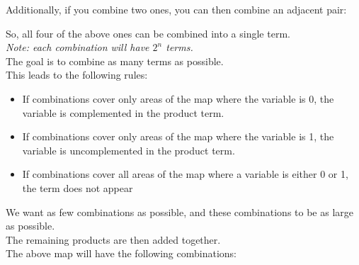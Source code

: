 \documentclass[nobib]{tufte-handout}
\begin{document}
Additionally, if you combine two ones, you can then combine an adjacent pair:
\begin{center}
\end{center}
So, all four of the above ones can be combined into a single term.\\
\textit{Note: each combination will have $2^n$ terms.}\\
The goal is to combine as many terms as possible.\\
This leads to the following rules:
\begin{itemize}
    \item If combinations cover only areas of the map where the variable is 0, the
          variable is complemented in the product term.
    \item If combinations cover only areas of the map where the variable is 1, the
          variable is uncomplemented in the product term.
    \item If combinations cover all areas of the map where a variable is either 0 or 1,
          the term does not appear
\end{itemize}
We want as few combinations as possible, and these combinations to be as large as possible.\\
The remaining products are then added together.\\
The above map will have the following combinations:\\
\end{document}
